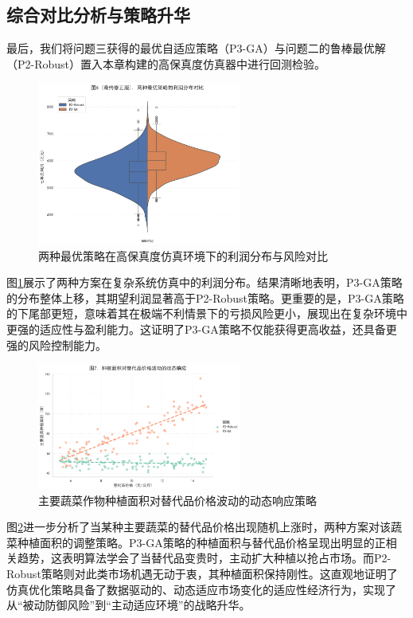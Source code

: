 \documentclass[withoutpreface,bwprint]{cumcmthesis} %
\begin{document}
\subsection{综合对比分析与策略升华}

最后，我们将问题三获得的最优自适应策略（P3-GA）与问题二的鲁棒最优解（P2-Robust）置入本章构建的高保真度仿真器中进行回测检验。

\begin{figure}[htbp]
	\centering
	\includegraphics[width=0.6\textwidth]{figures/3_4.png}
	\caption{两种最优策略在高保真度仿真环境下的利润分布与风险对比}
	\label{fig:3_4}
\end{figure}

图\ref{fig:3_4}展示了两种方案在复杂系统仿真中的利润分布。结果清晰地表明，P3-GA策略的分布整体上移，其期望利润显著高于P2-Robust策略。更重要的是，P3-GA策略的下尾部更短，意味着其在极端不利情景下的亏损风险更小，展现出在复杂环境中更强的适应性与盈利能力。这证明了P3-GA策略不仅能获得更高收益，还具备更强的风险控制能力。

\begin{figure}[htbp]
	\centering
	\includegraphics[width=0.6\textwidth]{figures/3_5.png}
	\caption{主要蔬菜作物种植面积对替代品价格波动的动态响应策略}
	\label{fig:3_5}
\end{figure}

图\ref{fig:3_5}进一步分析了当某种主要蔬菜的替代品价格出现随机上涨时，两种方案对该蔬菜种植面积的调整策略。P3-GA策略的种植面积与替代品价格呈现出明显的正相关趋势，这表明算法学会了当替代品变贵时，主动扩大种植以抢占市场。而P2-Robust策略则对此类市场机遇无动于衷，其种植面积保持刚性。这直观地证明了仿真优化策略具备了数据驱动的、动态适应市场变化的适应性经济行为，实现了从“被动防御风险”到“主动适应环境”的战略升华。

\newpage



\newpage
\end{document}
